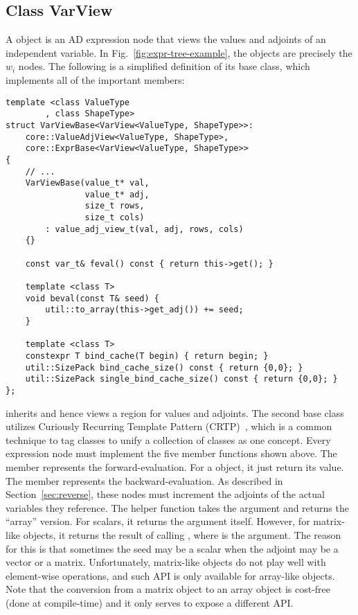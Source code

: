 \subsection{Class VarView}\label{ssec:var_view}

A  object is an AD expression node
that views the values and adjoints of an independent variable.
In Fig.~\ref{fig:expr-tree-example}, the  objects are precisely the $w_i$ nodes.
The following is a simplified definition of its base class, 
which implements all of the important members:
\begin{lstlisting}[style=customcpp]
template <class ValueType
        , class ShapeType>
struct VarViewBase<VarView<ValueType, ShapeType>>:
    core::ValueAdjView<ValueType, ShapeType>,
    core::ExprBase<VarView<ValueType, ShapeType>>
{
    // ...
    VarViewBase(value_t* val,
                value_t* adj,
                size_t rows,
                size_t cols)
        : value_adj_view_t(val, adj, rows, cols)
    {}

    const var_t& feval() const { return this->get(); }

    template <class T>
    void beval(const T& seed) { 
        util::to_array(this->get_adj()) += seed; 
    }

    template <class T>
    constexpr T bind_cache(T begin) { return begin; }
    util::SizePack bind_cache_size() const { return {0,0}; }
    util::SizePack single_bind_cache_size() const { return {0,0}; }
};
\end{lstlisting}

 inherits  and hence views
a region for values and adjoints.
The second base class  utilizes Curiously Recurring Template Pattern (CRTP)~\cite{abrahams:2005},
which is a common technique to tag classes to unify a collection of classes as one concept.
Every expression node must implement the five member functions shown above.
The member  represents the forward-evaluation.
For a  object, it just return its value.
The member  represents the backward-evaluation.
As described in Section~\ref{sec:reverse}, 
these nodes must increment the adjoints of the actual variables they reference.
The helper function  takes the argument and returns the ``array'' version.
For scalars, it returns the argument itself.
However, for  matrix-like objects, 
it returns the result of calling , where  is the argument.
The reason for this is that sometimes the seed may be a scalar
when the adjoint may be a vector or a matrix.
Unfortunately,  matrix-like objects do not play well with element-wise operations,
and such API is only available for array-like objects.
Note that the conversion from a matrix object to an array object 
is cost-free (done at compile-time) and it only serves to expose a different API.\@

